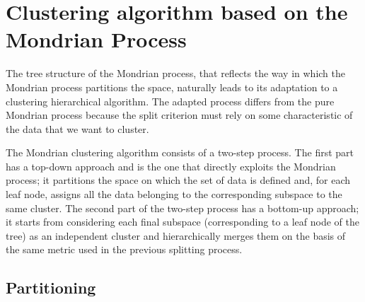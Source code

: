 \documentclass[a4paper]{article}
\begin{document}
\newpage



\section{Clustering algorithm based on the Mondrian Process}


The tree structure of the Mondrian process, that reflects the way in which the Mondrian process partitions the space, naturally leads to its adaptation to a clustering hierarchical algorithm.
The adapted process differs from the pure Mondrian process because the split criterion must rely on some characteristic of the data that we want to cluster.


The Mondrian clustering algorithm consists of a two-step process.%
The first part  has a top-down approach and is the one that directly exploits the Mondrian process; 
it partitions the space on which the set of data is defined and, for each leaf node, assigns all the data belonging to the corresponding subspace to the same cluster.
The second part of the two-step process has a bottom-up approach;
it starts from considering each final subspace (corresponding to a leaf node of the tree) as an independent cluster and hierarchically merges them on the basis of the same metric used in the previous splitting process.




\subsection{Partitioning}
\end{document}
